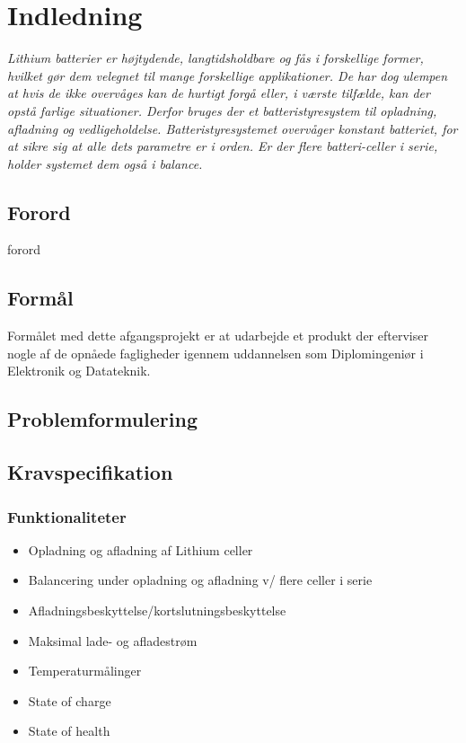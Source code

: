 \chapter{Indledning}

\emph{Lithium batterier er højtydende, langtidsholdbare og fås i forskellige former, hvilket gør dem velegnet til mange forskellige applikationer. De har dog ulempen at hvis de ikke overvåges kan de hurtigt forgå eller, i værste tilfælde, kan der opstå farlige situationer. Derfor bruges der et batteristyresystem til opladning, afladning og vedligeholdelse. Batteristyresystemet overvåger konstant batteriet, for at sikre sig at alle dets parametre er i orden. Er der flere batteri-celler i serie, holder systemet dem også i balance. }

\section{Forord}\label{sec:forord}
forord

\section{Formål}
Formålet med dette afgangsprojekt er at udarbejde et produkt der efterviser nogle af de opnåede fagligheder igennem uddannelsen som Diplomingeniør i Elektronik og Datateknik.

\section{Problemformulering}


\section{Kravspecifikation} \label{afs:kravspecifikation}

\subsection{Funktionaliteter}

\begin{itemize}
	\item Opladning og aﬂadning af Lithium celler
	\item Balancering under opladning og aﬂadning v/ ﬂere celler i serie
	\item Aﬂadningsbeskyttelse/kortslutningsbeskyttelse
	\item Maksimal lade- og aﬂadestrøm
	\item Temperaturmålinger
	\item State of charge
	\item State of health
\end{itemize} 
